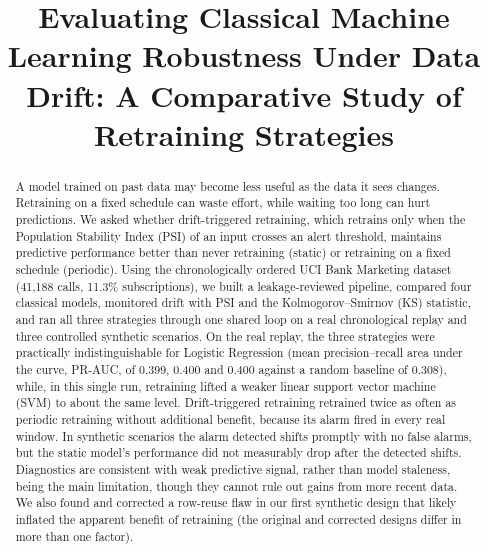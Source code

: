 \documentclass[conference]{IEEEtran}
\begin{document}
\title{Evaluating Classical Machine Learning Robustness Under Data Drift: A Comparative Study of Retraining Strategies}

\author{
\and
{}
\and
{}
\and
{}
}

\maketitle

\begin{abstract}
A model trained on past data may become less useful as the data it sees changes. Retraining on a fixed schedule can waste effort, while waiting too long can hurt predictions. We asked whether drift-triggered retraining, which retrains only when the Population Stability Index (PSI) of an input crosses an alert threshold, maintains predictive performance better than never retraining (static) or retraining on a fixed schedule (periodic). Using the chronologically ordered UCI Bank Marketing dataset (41,188 calls, 11.3\% subscriptions), we built a leakage-reviewed pipeline, compared four classical models, monitored drift with PSI and the Kolmogorov--Smirnov (KS) statistic, and ran all three strategies through one shared loop on a real chronological replay and three controlled synthetic scenarios. On the real replay, the three strategies were practically indistinguishable for Logistic Regression (mean precision--recall area under the curve, PR-AUC, of 0.399, 0.400 and 0.400 against a random baseline of 0.308), while, in this single run, retraining lifted a weaker linear support vector machine (SVM) to about the same level. Drift-triggered retraining retrained twice as often as periodic retraining without additional benefit, because its alarm fired in every real window. In synthetic scenarios the alarm detected shifts promptly with no false alarms, but the static model's performance did not measurably drop after the detected shifts. Diagnostics are consistent with weak predictive signal, rather than model staleness, being the main limitation, though they cannot rule out gains from more recent data. We also found and corrected a row-reuse flaw in our first synthetic design that likely inflated the apparent benefit of retraining (the original and corrected designs differ in more than one factor).
\end{abstract}
\end{document}
